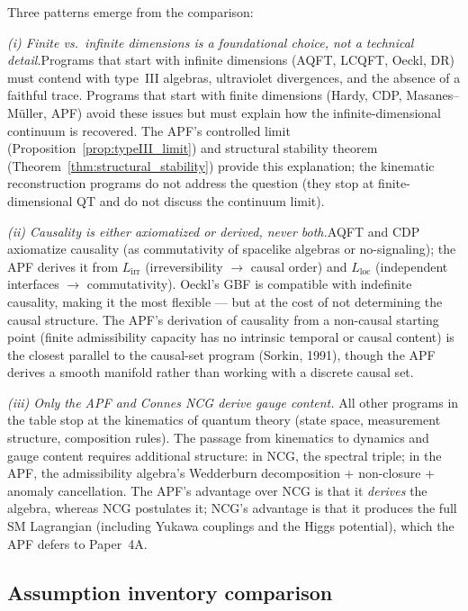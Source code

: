 \documentclass[11pt]{article}
\theoremstyle{definition}
\begin{document}
\smallskip\noindent Three patterns emerge from the comparison:

\textit{(i) Finite vs.\ infinite dimensions is a foundational choice,
not a technical detail.}\quad Programs that start with infinite
dimensions (AQFT, LCQFT, Oeckl, DR) must contend with type~III
algebras, ultraviolet divergences, and the absence of a faithful
trace.  Programs that start with finite dimensions (Hardy, CDP,
Masanes--M\"uller, APF) avoid these issues but must explain how the
infinite-dimensional continuum is recovered.  The APF's controlled
limit (Proposition~\ref{prop:typeIII_limit}) and structural stability
theorem (Theorem~\ref{thm:structural_stability}) provide this
explanation; the kinematic reconstruction programs do not address the
question (they stop at finite-dimensional QT and do not discuss the
continuum limit).

\textit{(ii) Causality is either axiomatized or derived, never
both.}\quad AQFT and CDP axiomatize causality (as commutativity of
spacelike algebras or no-signaling); the APF derives it from
$L_{\mathrm{irr}}$ (irreversibility $\to$ causal order) and
$L_{\mathrm{loc}}$ (independent interfaces $\to$ commutativity).
Oeckl's GBF is compatible with indefinite causality, making it the
most flexible --- but at the cost of not determining the causal
structure.  The APF's derivation of causality from a non-causal
starting point (finite admissibility capacity has no intrinsic temporal
or causal content) is the closest parallel to the causal-set program
(Sorkin, 1991), though the APF derives a smooth manifold rather than
working with a discrete causal set.

\textit{(iii) Only the APF and Connes NCG derive gauge content.}\quad
All other programs in the table stop at the kinematics of quantum
theory (state space, measurement structure, composition rules).  The
passage from kinematics to dynamics and gauge content requires
additional structure: in NCG, the spectral triple; in the APF, the
admissibility algebra's Wedderburn decomposition + non-closure +
anomaly cancellation.  The APF's advantage over NCG is that it
\emph{derives} the algebra, whereas NCG postulates it; NCG's
advantage is that it produces the full SM Lagrangian (including Yukawa
couplings and the Higgs potential), which the APF defers to Paper~4A.


\subsection{Assumption inventory comparison}
\label{sec:assumption_comparison}
\end{document}
